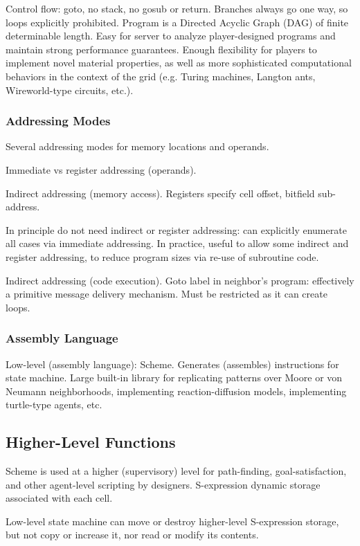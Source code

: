 \documentclass{acm_proc_article-sp}
\begin{document}
Control flow: goto, no stack, no gosub or return.
Branches always go one way, so loops explicitly prohibited.
Program is a Directed Acyclic Graph (DAG) of finite determinable length.
Easy for server to analyze player-designed programs and maintain strong performance guarantees.
Enough flexibility for players to implement novel material properties,
as well as more sophisticated computational behaviors in the context of the grid (e.g. Turing machines, Langton ants, Wireworld-type circuits, etc.).

\subsubsection{Addressing Modes}

Several addressing modes for memory locations and operands.

Immediate vs register addressing (operands).

Indirect addressing (memory access). Registers specify cell offset, bitfield sub-address.

In principle do not need indirect or register addressing: can explicitly enumerate all cases via immediate addressing.
In practice, useful to allow some indirect and register addressing, to reduce program sizes via re-use of subroutine code.

Indirect addressing (code execution).
Goto label in neighbor's program: effectively a primitive message delivery mechanism.
Must be restricted as it can create loops.

\subsubsection{Assembly Language}

Low-level (assembly language):
Scheme. Generates (assembles) instructions for state machine.
Large built-in library for replicating patterns over Moore or von Neumann neighborhoods,
implementing reaction-diffusion models, implementing turtle-type agents, etc.

\subsection{Higher-Level Functions}

Scheme is used at a higher (supervisory) level for path-finding, goal-satisfaction, and other agent-level scripting by designers.
S-expression dynamic storage associated with each cell.

Low-level state machine can move or destroy higher-level S-expression storage, but not copy or increase it, nor read or modify its contents.
\end{document}
